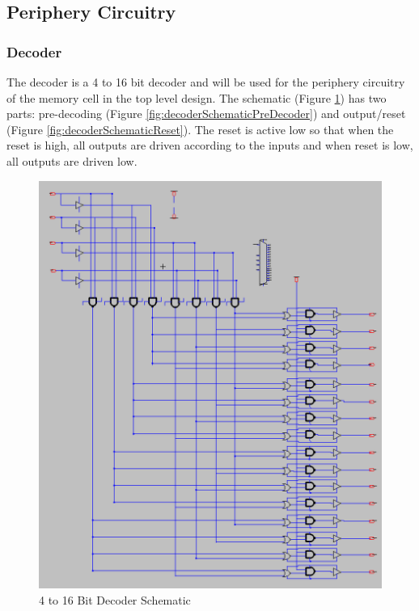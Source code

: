 \documentclass[a4paper]{article}
\begin{document}
\subsection{Periphery Circuitry}

\subsubsection{Decoder}
\label{sec:decoder_design}
The decoder is a 4 to 16 bit decoder and will be used for the periphery circuitry of the memory cell in the top level design. The schematic (Figure \ref{fig:decoderSchematic}) has two parts: pre-decoding (Figure \ref{fig:decoderSchematicPreDecoder}) and output/reset (Figure \ref{fig:decoderSchematicReset}). The reset is active low so that when the reset is high, all outputs are driven according to the inputs and when reset is low, all outputs are driven low. 

\begin{figure}[H]
	\centering
	\includegraphics[scale=0.35]{decoderSchematic}
	\caption{4 to 16 Bit Decoder Schematic}
	\label{fig:decoderSchematic}
\end{figure}
\end{document}
